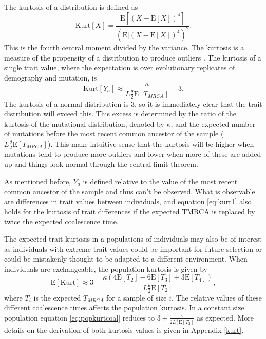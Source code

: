 \documentclass{article}
\newcommand{\T}{\frac{\theta}{2}}
\newcommand{\E}{\mathrm{E}}
\begin{document}
The kurtosis of a distribution is defined as
\begin{equation*}
  \mbox{Kurt}[X]=\frac{\E[(X-\E[X])^4]}{(\E[(X-\E[X])^4)^2}.
\end{equation*}
This is the fourth central moment divided by the variance. The kurtosis is a
measure of the propensity of a distribution to produce outliers
\citep{Westfall2014}. The kurtosis of a single trait value, where the
expectation is over evolutionary replicates of demography and mutation, is 
\begin{equation}
  \label{eq:kurt1}
  \mbox{Kurt}[Y_a] \approx \frac{\kappa}{L\T \E[T_{MRCA}]} + 3.
\end{equation}
The kurtosis of a normal distribution is $3$, so it is immediately clear that
the trait distribution will exceed this. This excess is determined by the ratio
of the kurtosis of the mutational distribution, denoted by $\kappa$, and the
expected number of mutations before the most recent common ancestor of the
sample ($L\T \E[T_{MRCA}]$). This make intuitive sense that the kurtosis will be
higher when mutations tend to produce more outliers and lower when more of these
are added up and things look normal through the central limit theorem. 

As mentioned before, $Y_a$ is defined relative to the value of the most recent
common ancestor of the sample and thus can't be observed. What is observable are
differences in trait values between individuals, and equation \eqref{eq:kurt1}
also holds for the kurtosis of trait differences if the expected TMRCA is
replaced by twice the expected coalescence time. 

The expected trait kurtosis in a populations of individuals may also be of
interest as individuals with extreme trait values could be important for future
selection or could be mistakenly thought to be adapted to a different
environment. When individuals are exchangeable, the population kurtosis is given
by
\begin{equation}
  \label{eq:popkurtcoal}
  \E[\mbox{Kurt}] \approx 3 + \frac{\kappa( 4\E[T_2] - 6\E[T_3] + 
    3\E[T_4])}{L \T \E[T_2]},
\end{equation}
where $T_i$ is the expected $T_{MRCA}$ for a sample of size $i$. The relative
values of these different coalescence times affects the population kurtosis. In
a constant size population equation \eqref{eq:popkurtcoal} reduces to
$3 + \frac{\kappa}{2L\T \E[T_2]}$ as expected. More details on the derivation of
both kurtosis values is given in Appendix \ref{kurt}.
\end{document}

